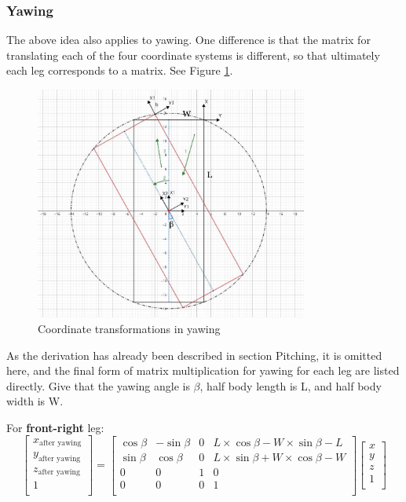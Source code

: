 \subsubsection{Yawing}

The above idea also applies to yawing. One difference is that the matrix for translating each of the four coordinate systems is different, so that ultimately each leg corresponds to a matrix. See Figure \ref{fig:coordinate_transformations_in_yawing}.

\begin{figure}[htbp]
   \centering
   \includegraphics[width=0.8\textwidth]{figures/coordinate_transformations_in_yawing.jpg}
   \caption{Coordinate transformations in yawing}
   \label{fig:coordinate_transformations_in_yawing}
\end{figure}

As the derivation has already been described in section Pitching, it is omitted here, and the final form of matrix multiplication for yawing for each leg are listed directly. Give that the yawing angle is $\beta$, half body length is L, and half body width is W.

For \textbf{front-right} leg:
\begin{equation}
   \begin{bmatrix}
   x_\text{after yawing} \\
   y_\text{after yawing} \\
   z_\text{after yawing} \\
   1                     \\
   \end{bmatrix}
   =
   \begin{bmatrix}
   \cos\beta & -\sin\beta & 0 & L \times \cos\beta - W \times \sin\beta - L \\
   \sin\beta & \cos\beta & 0 & L \times \sin\beta + W \times \cos\beta - W \\
   0 & 0 & 1 & 0 \\
   0 & 0 & 0 & 1 \\
   \end{bmatrix}
   \begin{bmatrix}
   x \\
   y \\
   z \\
   1 \\
   \end{bmatrix}
\end{equation}

